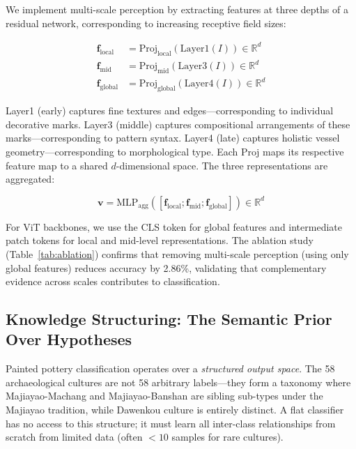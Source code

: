 \documentclass[10pt,twocolumn,letterpaper]{article}
\begin{document}
We implement multi-scale perception by extracting features at three depths of a residual network, corresponding to increasing receptive field sizes:

\begin{align}
\mathbf{f}_{\text{local}} &= \text{Proj}_{\text{local}}(\text{Layer1}(I)) \in \mathbb{R}^{d} \label{eq:local} \\
\mathbf{f}_{\text{mid}} &= \text{Proj}_{\text{mid}}(\text{Layer3}(I)) \in \mathbb{R}^{d} \label{eq:mid} \\
\mathbf{f}_{\text{global}} &= \text{Proj}_{\text{global}}(\text{Layer4}(I)) \in \mathbb{R}^{d} \label{eq:global}
\end{align}

Layer1 (early) captures fine textures and edges---corresponding to individual decorative marks. Layer3 (middle) captures compositional arrangements of these marks---corresponding to pattern syntax. Layer4 (late) captures holistic vessel geometry---corresponding to morphological type. Each $\text{Proj}$ maps its respective feature map to a shared $d$-dimensional space. The three representations are aggregated:

\begin{equation}
\mathbf{v} = \text{MLP}_{\text{agg}}([\mathbf{f}_{\text{local}}; \mathbf{f}_{\text{mid}}; \mathbf{f}_{\text{global}}]) \in \mathbb{R}^{d}
\label{eq:agg}
\end{equation}

For ViT backbones, we use the CLS token for global features and intermediate patch tokens for local and mid-level representations. The ablation study (Table~\ref{tab:ablation}) confirms that removing multi-scale perception (using only global features) reduces accuracy by 2.86\%, validating that complementary evidence across scales contributes to classification.

\subsection{Knowledge Structuring: The Semantic Prior Over Hypotheses}

Painted pottery classification operates over a \emph{structured output space}. The 58 archaeological cultures are not 58 arbitrary labels---they form a taxonomy where Majiayao-Machang and Majiayao-Banshan are sibling sub-types under the Majiayao tradition, while Dawenkou culture is entirely distinct. A flat classifier has no access to this structure; it must learn all inter-class relationships from scratch from limited data (often $<10$ samples for rare cultures).
\end{document}
